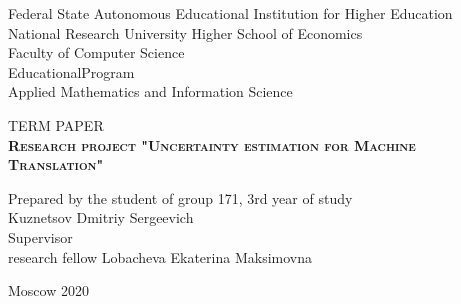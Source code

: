 \begin{titlepage}
\newpage

{
\begin{center}
Federal State Autonomous Educational Institution for Higher Education \\
National Research University Higher School of Economics
\\
\bigskip
Faculty of Computer Science \\
EducationalProgram \\
Applied Mathematics and Information Science \\
\end{center}
}

\vspace{8em}

\begin{center}
{\Large TERM PAPER}\\
\textsc{\textbf{
Research project
\linebreak
"Uncertainty estimation for Machine Translation"}}
\end{center}

\vspace{2em}

{
\hfill\parbox{16cm}{
\hspace*{5cm}\hspace*{-5cm}Prepared by the student of group 171, 3rd year of study\\
Kuznetsov Dmitriy Sergeevich\\
 
\hspace*{5cm}\hspace*{-5cm}Supervisor \\
research fellow Lobacheva Ekaterina Maksimovna \\
}
}

\vspace{\fill}

\begin{center}
Moscow 2020
\end{center}

\end{titlepage}